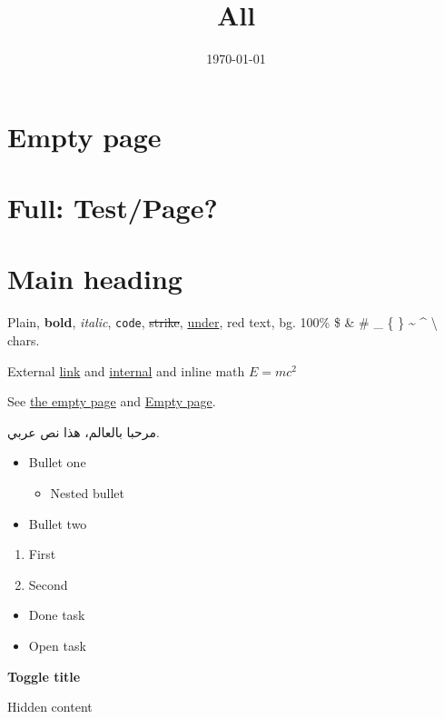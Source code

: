\documentclass[11pt,a4paper]{article}
\title{All}
\author{}
\date{\today}
\begin{document}
\maketitle



\clearpage
\section{Empty page}



\clearpage
\section{Full: Test/Page?}

\section*{Main heading}
Plain, \textbf{bold}, \textit{italic}, \texttt{code}, \sout{strike}, \underline{under}, red text, bg. 100\% \$ \& \# \_ \{ \} \textasciitilde{} \textasciicircum{} \textbackslash{} chars.\par\medskip
External \href{https://example.com/a?b=1\#c}{link} and \href{/aabbccddeeff00112233445566778899}{internal} and inline math $E=mc^2$\par\medskip
See \href{/bbbbbbbbbbbbbbbbbbbbbbbbbbbbbbbb}{the empty page} and \href{https://www.notion.so/bbbbbbbbbbbbbbbbbbbbbbbbbbbbbbbb}{Empty page}.\par\medskip
مرحبا بالعالم، هذا نص عربي.\par\medskip
\begin{itemize}
  \item Bullet one
\begin{itemize}
  \item Nested bullet
\end{itemize}
  \item Bullet two
\end{itemize}
\begin{enumerate}
  \item First
  \item Second
\end{enumerate}
\begin{itemize}
  \item[$\boxtimes$] Done task
  \item[$\square$] Open task
\end{itemize}
\textbf{Toggle title}\par\medskip
Hidden content\par\medskip
\end{document}
